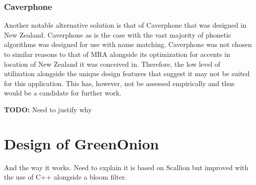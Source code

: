 \subsubsection{Caverphone}
Another notable alternative solution is that of Caverphone that was designed in New Zealand. Caverphone as is the case with the vast majority of phonetic algorithms was designed for use with name matching. Caverphone was not chosen to similar reasons to that of MRA alongside its optimization for accents in location of New Zealand it was conceived in. Therefore, the low level of utilization alongside the unique design features that suggest it may not be suited for this application. This has, however, not be assessed empirically and thus would be a candidate for further work.


%




\textbf{TODO: } Need to justify why


\section{Design of GreenOnion}
And the way it works. Need to explain it is based on Scallion but improved with the use of C++ alongside a bloom filter.
